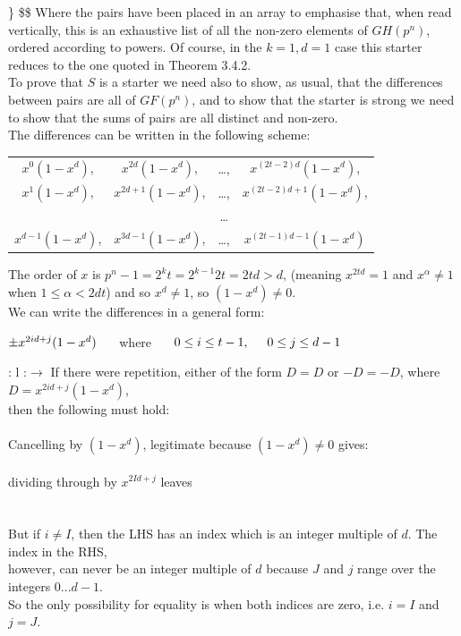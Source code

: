 \documentclass[
  12pt,
  a4paper]{book}
\begin{document}
\} \$\$ Where the pairs have been placed in an array to emphasise that,
when read vertically, this is an exhaustive list of all the non-zero
elements of \(GH(p^n)\), ordered according to powers. Of course, in the
\(k=1,d=1\) case this starter reduces to the one quoted in Theorem 3.4.2.\\
To prove that \(S\) is a starter we need also to show, as usual, that the
differences between pairs are all of \(GF(p^n)\), and to show that the
starter is strong we need to show that the sums of pairs are all
distinct and non-zero.\\
The differences can be written in the following scheme:

\begin{longtable}[]{@{}cccc@{}}
\toprule
\endhead
\(x^0(1-x^d)\), & \(x^{2d}(1-x^d)\), & \ldots, & \(x^{(2t-2)d}(1-x^d)\),\tabularnewline
\(x^1(1-x^d)\), & \(x^{2d+1}(1-x^d)\), & \ldots, & \(x^{(2t-2)d+1}(1-x^d)\),\tabularnewline
& & \ldots{} &\tabularnewline
\(x^{d-1}(1-x^d)\), & \(x^{3d-1}(1-x^d)\), & \ldots, & \(x^{(2t-1)d-1}(1-x^d)\)\tabularnewline
\bottomrule
\end{longtable}

The order of \(x\) is \(p^n-1=2^kt=2^{k-1}2t=2td > d\), (meaning \(x^{2td}=1\)
and \(x^\alpha \neq 1\) when \(1 \leq \alpha < 2dt\)) and so \(x^d \neq 1\),
so \((1-x^d) \neq 0\).\\
We can write the differences in a general form:

\(\pm x^{2id+j}(1-x^d) \hspace{0.5cm}\) where
\(\hspace{0.5cm} 0 \leq i \leq t-1, \hspace{0.5cm} 0 \leq j \leq d-1\)

{: l :}\(\rightarrow\) If there were repetition, either of the
form \(D=D\) or \(-D=-D\), where \(D=x^{2id+j}(1-x^d)\),\\
then the following must hold:\\
~\\
Cancelling by \((1-x^d)\), legitimate because \((1-x^d) \neq 0\) gives:\\
~\\
dividing through by \(x^{2Id+j}\) leaves\\
~\\
~\\
But if \(i \neq I\), then the LHS has an index which is an integer
multiple of \(d\). The index in the RHS,\\
however, can never be an integer multiple of \(d\) because \(J\) and \(j\)
range over the integers \(0...d-1\).\\
So the only possibility for equality is when both indices are zero, i.e.
\(i=I\) and \(j=J\).\\
\end{document}
